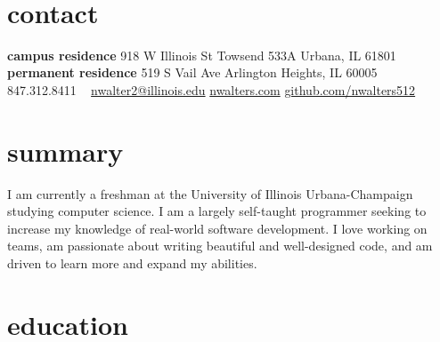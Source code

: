 \documentclass[]{resume}
\begin{document}


\begin{aside} %
~\vspace{0.6cm}
\section{contact}\vspace{0.25cm}
\textbf{campus residence}
918 W Illinois St
Towsend 533A
Urbana, IL
61801
~
\textbf{permanent residence}
519 S Vail Ave
Arlington Heights, IL
60005
~
847.312.8411
~
\href{mailto:nwalter2@illinois.edu}{nwalter2@illinois.edu}
\href{http://www.nwalters.com}{nwalters.com}
\href{http://github.com/nwalters512}{github.com/nwalters512}
\end{aside}



\vspace{0.7cm} %
\section{summary}

I am currently a freshman at the University of Illinois Urbana-Champaign studying computer science. I am a largely self-taught programmer seeking to increase my knowledge of real-world software development. I love working on teams, am passionate about writing beautiful and well-designed code, and am driven to learn more and expand my abilities.


\section{education}
\end{document}
